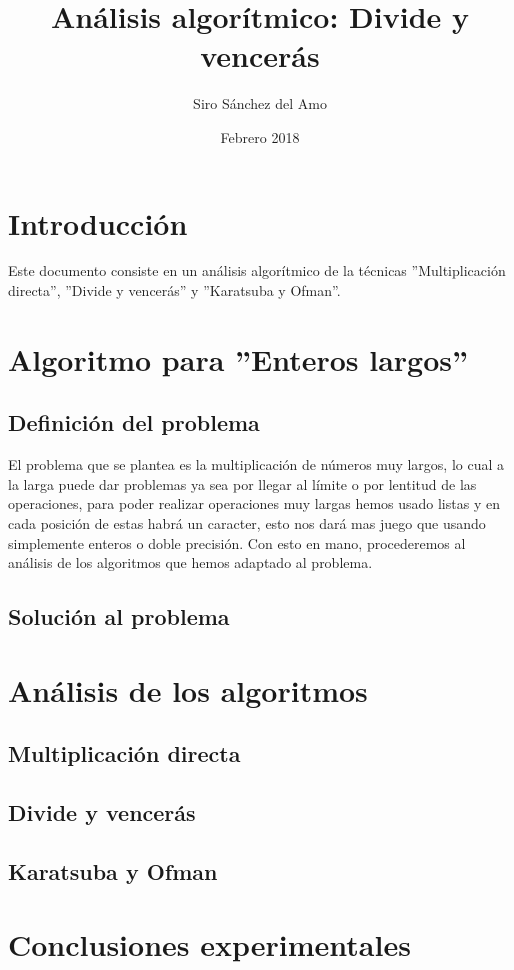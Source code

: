 \documentclass{article}
\title{Análisis algorítmico: Divide y vencerás}
\author{Siro Sánchez del Amo}
\date{Febrero 2018}
\begin{document}
\maketitle

\thispagestyle{empty}
\newpage

\tableofcontents
\thispagestyle{fancy}
\newpage

\section{Introducción}
Este documento consiste en un análisis algorítmico de la técnicas ''Multiplicación directa'', ''Divide y vencerás'' y ''Karatsuba y Ofman''.

\section{Algoritmo para ''Enteros largos''}
\subsection{Definición del problema}
El problema que se plantea es la multiplicación de números muy largos, lo cual a la larga puede dar problemas ya sea por llegar al límite o por lentitud de las operaciones, para poder realizar operaciones muy largas hemos usado listas y en cada posición de estas habrá un caracter, esto nos dará mas juego que usando simplemente enteros o doble precisión. Con esto en mano, procederemos al análisis de los algoritmos que hemos adaptado al problema.

\subsection{Solución al problema}

\section{Análisis de los algoritmos}
\subsection{Multiplicación directa}

\subsection{Divide y vencerás}

\subsection{Karatsuba y Ofman}

\section{Conclusiones experimentales}
\end{document}
